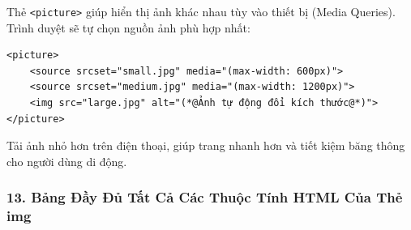 \documentclass[11pt,oneside]{book}
\newcommand{\codeinline}[1]{\textcolor{accentOrange}{\texttt{#1}}}
\begin{document}
Thẻ \codeinline{<picture>} giúp hiển thị ảnh khác nhau tùy vào thiết bị (Media Queries). Trình duyệt sẽ tự chọn nguồn ảnh phù hợp nhất:

\begin{codeWindow}
\begin{lstlisting}[language=HTML5]
<picture>
    <source srcset="small.jpg" media="(max-width: 600px)">
    <source srcset="medium.jpg" media="(max-width: 1200px)">
    <img src="large.jpg" alt="(*@Ảnh tự động đổi kích thước@*)">
</picture>
\end{lstlisting}
\end{codeWindow}

\begin{tipBox}
Tải ảnh nhỏ hơn trên điện thoại, giúp trang nhanh hơn và tiết kiệm băng thông cho người dùng di động.
\end{tipBox}

\subsubsection{13. Bảng Đầy Đủ Tất Cả Các Thuộc Tính HTML Của Thẻ img}
\end{document}
